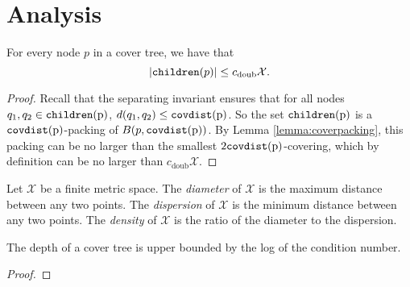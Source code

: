 \documentclass[../main.tex]{subfiles}
\newcommand{\set}[1]{\mathcal {#1}}
\newcommand{\dist}[2]{\distf({#1},{#2})}
\newcommand{\distf}{d}
\newcommand{\doubnum}{c_\text{doub}}
\newcommand{\p}{\ensuremath p}
\newcommand{\children}[1]{\ensuremath{\textup{\text{\ttfamily children}({#1})}}}
\newcommand{\covdist}[1]{\ensuremath{\textup{\text{\ttfamily covdist}({#1})}}}
\begin{document}

\section{Analysis}

\begin{lemma}
    For every node $p$ in a cover tree, we have that
    \begin{equation}
        |\children\p| \le \doubnum \set X
        .
    \end{equation}
\end{lemma}

\begin{proof}
    Recall that the separating invariant ensures that for all nodes $q_1,q_2\in\children p$,
    $\dist{q_1}{q_2}\le\covdist p$.
    So the set \children p is a $\covdist p$-packing of $B(p,\covdist p)$.
    By Lemma \ref{lemma:coverpacking}, this packing can be no larger than the smallest $2\covdist p$-covering,
    which by definition can be no larger than $\doubnum \set X$.
\end{proof}

\begin{definition}
    Let $\set X$ be a finite metric space.
    The \emph{diameter} of $\set X$ is the maximum distance between any two points.
    The \emph{dispersion} of $\set X$ is the minimum distance between any two points.
    The \emph{density} of $\set X$ is the ratio of the diameter to the dispersion.
\end{definition}

\begin{lemma}
    The depth of a cover tree is upper bounded by the log of the condition number.
\end{lemma}

\begin{proof}
\end{proof}
\end{document}
